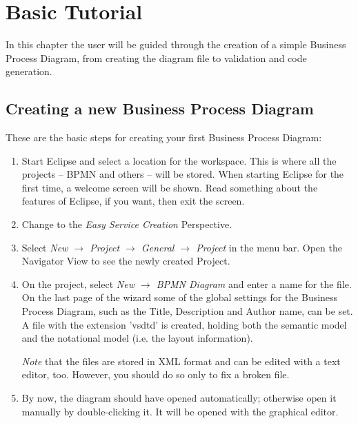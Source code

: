 \chapter{Basic Tutorial}
\label{sec:user_tut}

In this chapter the user will be guided through the creation of a simple Business Process Diagram, from creating the diagram file to validation and code generation.


\section{Creating a new Business Process Diagram}
\label{sec:user_tut_new}

These are the basic steps for creating your first Business Process Diagram:

\begin{enumerate}
	
	\item Start Eclipse and select a location for the workspace. This is where all the projects -- BPMN and others -- will be stored. When starting Eclipse for the first time, a welcome screen will be shown. Read something about the features of Eclipse, if you want, then exit the screen.
	
	\item Change to the \emph{Easy Service Creation} Perspective.
	
	\item Select \emph{ New $\rightarrow$ Project $\rightarrow$ General $\rightarrow$ Project } in the menu bar. Open the Navigator View to see the newly created Project.
	
	\item On the project, select \emph{New $\rightarrow$ BPMN Diagram} and enter a name for the file.  On the last page of the wizard some of the global settings for the Business Process Diagram, such as the Title, Description and Author name, can be set.  %
	A file with the extension 'vsdtd' is created, holding both the semantic model and the notational model (i.e. the layout information).
	
	\emph{Note} that the files are stored in XML format and can be edited with a text editor, too. However, you should do so only to fix a broken file. %
	
	\item By now, the diagram should have opened automatically; otherwise open it manually by double-clicking it. It will be opened with the graphical editor. %

\end{enumerate}


